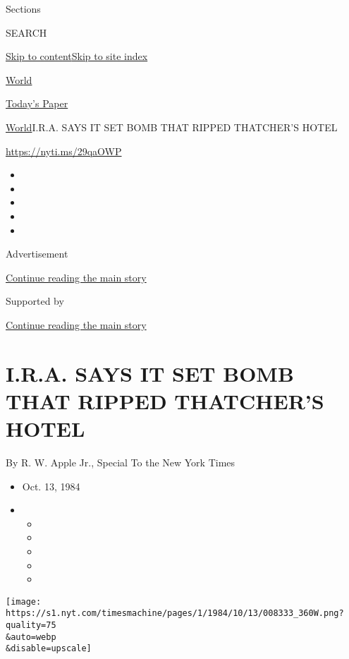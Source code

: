 Sections

SEARCH

\protect\hyperlink{site-content}{Skip to
content}\protect\hyperlink{site-index}{Skip to site index}

\href{https://www.nytimes.com/section/world}{World}

\href{https://myaccount.nytimes.com/auth/login?response_type=cookie\&client_id=vi}{}

\href{https://www.nytimes.com/section/todayspaper}{Today's Paper}

\href{/section/world}{World}\textbar{}I.R.A. SAYS IT SET BOMB THAT
RIPPED THATCHER'S HOTEL

\url{https://nyti.ms/29qaOWP}

\begin{itemize}
\item
\item
\item
\item
\item
\end{itemize}

Advertisement

\protect\hyperlink{after-top}{Continue reading the main story}

Supported by

\protect\hyperlink{after-sponsor}{Continue reading the main story}

\hypertarget{ira-says-it-set-bomb-that-ripped-thatchers-hotel}{%
\section{I.R.A. SAYS IT SET BOMB THAT RIPPED THATCHER'S
HOTEL}\label{ira-says-it-set-bomb-that-ripped-thatchers-hotel}}

By R. W. Apple Jr., Special To the New York Times

\begin{itemize}
\item
  Oct. 13, 1984
\item
  \begin{itemize}
  \item
  \item
  \item
  \item
  \item
  \end{itemize}
\end{itemize}

\texttt{[image: https://s1.nyt.com/timesmachine/pages/1/1984/10/13/008333\_360W.png?quality=75\\\&auto=webp\\\&disable=upscale]}

